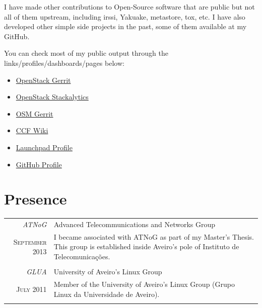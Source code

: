 \documentclass[letter,10pt]{article} %
\begin{document}
I have made other contributions to Open-Source software that are public but not all of them upstream, including irssi, Yakuake, metastore, tox, etc. I have also developed other simple side projects in the past, some of them available at my GitHub.

You can check most of my public output through the links/profiles/dashboards/pages below:
\begin{itemize}
    \item \href{https://review.openstack.org/#/q/owner:igordcard}{OpenStack Gerrit}
    \item \href{http://stackalytics.com/?user_id=igordcard&metric=marks&release=all}{OpenStack Stackalytics}
    \item \href{https://osm.etsi.org/gerrit/#/q/owner:cardosoi}{OSM Gerrit}
    \item \href{https://wiki.openstack.org/wiki/Neutron/CommonClassificationFramework}{CCF Wiki}
    \item \href{https://launchpad.net/~igordcard}{Launchpad Profile}
    \item \href{https://github.com/igordcard}{GitHub Profile}
\end{itemize}

%

\section{Presence}
\begin{tabular}{r|p{11cm}}
    \emph{ATNoG} & Advanced Telecommunications and Networks Group \\
    \textsc{September 2013} & \footnotesize{I became associated with ATNoG as part of my Master's Thesis. This group is established inside Aveiro's pole of Instituto de Telecomunicações.}\\
    \multicolumn{2}{c}{} \\
    \emph{GLUA} & University of Aveiro's Linux Group \\
    \textsc{July 2011} & \footnotesize{Member of the University of Aveiro's Linux Group (Grupo Linux da Universidade de Aveiro).}\\
    \multicolumn{2}{c}{}\\
\end{tabular}
\end{document}
